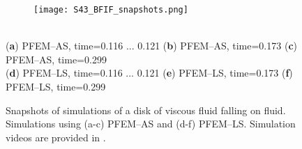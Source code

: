 \documentclass[final,3p,times]{elsarticle}
\begin{document}
\begin{figure}[t!]
\captionsetup[subfigure]{labelformat=empty}
\centering 
	\begin{subfigure}[b]{1.00\textwidth}
		\texttt{[image: S43\_BFIF\_snapshots.png]}
		\caption{}
		\label{Fig:BFIF_snapshots_a}
	\end{subfigure}
	\\
	\vspace{-41mm}
	\hspace{-13mm} \footnotesize{{(\textbf{a}}) PFEM--AS, time=0.116 ... 0.121}
	\hspace{17mm} {(\textbf{b})} PFEM--AS, time=0.173 
	\hspace{22mm} {(\textbf{c})} PFEM--AS, time=0.299
	\\
	\vspace{33mm}
	\hspace{-13mm} \footnotesize{(\textbf{d}) PFEM--LS, time=0.116 ... 0.121}
	\hspace{17mm} {(\textbf{e})} PFEM--LS, time=0.173 
	\hspace{21mm} {(\textbf{f})} PFEM--LS, time=0.299
	\\
	\begin{subfigure}[b]{0.00\textwidth} \caption{}
		\label{Fig:BFIF_snapshots_b}
	\end{subfigure}
	\begin{subfigure}[b]{0.00\textwidth} \caption{}
		\label{Fig:BFIF_snapshots_c}
	\end{subfigure}
	\begin{subfigure}[b]{0.00\textwidth} \caption{}
		\label{Fig:BFIF_snapshots_d}
	\end{subfigure}
	\begin{subfigure}[b]{0.00\textwidth} \caption{}
		\label{Fig:BFIF_snapshots_e}
	\end{subfigure}
	\begin{subfigure}[b]{0.00\textwidth} \caption{}
		\label{Fig:BFIF_snapshots_f}
	\end{subfigure}
	\vspace{-4mm}
\caption{Snapshots of simulations of a disk of viscous fluid falling on fluid. Simulations using (a-c) PFEM--AS and (d-f) PFEM--LS. Simulation videos are provided in \citep{YoutubeAll}.}
\label{Fig:BFIF_snapshots}
\end{figure}
\end{document}
